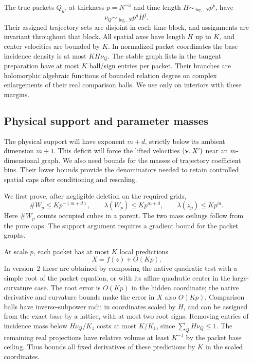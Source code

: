 The true packets \(Q_u\), at thickness \(p=N^{-u}\) and time length
\(H\sim_{\log,N}p^k\), have
\begin{equation}\label{a05:packet-mass}
 \nu_Q\sim_{\log,N}p^dH^j.
\end{equation}
Their assigned trajectory sets are disjoint in each time block,
and assignments are invariant throughout that block. All spatial
axes have length \(H\) up to \(K\), and center velocities are
bounded by \(K\). In normalized packet coordinates the base
incidence density is at most \(KH\nu_Q\).
The stable graph lists in the tangent preparation have at most
\(K\) ball/sign entries per packet. Their branches are holomorphic
algebraic functions of bounded relation degree on complex
enlargements of their real comparison balls.
We use  only on interiors with these margins.

\subsection{Physical support and parameter masses}

The physical support will have exponent \(m+d\), strictly below
its ambient dimension \(m+1\). This deficit will force the lifted
velocities \(({\bf v},X')\) near an \(m\)-dimensional graph.
We also need bounds for the masses of trajectory coefficient bins.
Their lower bounds provide the denominators needed to retain
controlled spatial caps after conditioning and rescaling.

We first prove, after negligible deletion on the required grids,
\begin{equation}\label{a05:physical-counts}
 \#W_p\leq Kp^{-(m+d)},\qquad
 \lambda(W_p)\leq Kp^{m+d},\qquad
 \lambda(z_p)\leq Kp^m.
\end{equation}
Here \(\#W_p\) counts occupied cubes in a parent. The two mass
ceilings follow from the pure caps. The support argument requires
a gradient bound for the packet graphs.

At scale \(p\), each packet has at most \(K\) local predictions
\[
 X=f(z)+O(Kp).
\]
In version~2 these are obtained by composing the native quadratic
test with a simple root of the packet equation, or with its affine
quadratic center in the large-curvature case. The root error is
\(O(Kp)\) in the hidden coordinate; the native derivative and
curvature bounds make the error in \(X\) also \(O(Kp)\).
Comparison balls have inverse-subpower radii in coordinates
scaled by \(H\), and can be assigned from the exact base by a
lattice, with at most two root signs. Removing entries of incidence
mass below \(H\nu_Q/K_1\) costs at most \(K/K_1\), since
\(\sum_QH\nu_Q\leq1\). The remaining real projections have relative
volume at least \(K^{-1}\) by the packet base ceiling.
Thus  bounds all fixed derivatives of
these predictions by \(K\) in the scaled coordinates.


